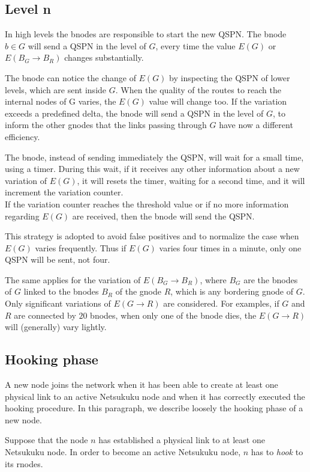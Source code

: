 \documentclass[a4paper]{article}
\begin{document}
\subsection{Level n}
In high levels the bnodes are responsible to start the new QSPN.
The bnode $b \in G$ will send a QSPN in the level of $G$, every time the value
$E(G)$ or\\$E(B_G\rightarrow B_R)$ changes substantially.

The bnode can notice the change of $E(G)$ by inspecting the QSPN of lower
levels, which are sent inside $G$.
When the quality of the routes to reach the internal nodes of G varies, the $E(G)$
value will change too. If the variation exceeds a predefined delta, the bnode
will send a QSPN in the level of $G$, to inform the other gnodes that the links
passing through $G$ have now a different efficiency.

The bnode, instead of sending immediately the QSPN, will wait for a small
time, using a timer. During this wait, if it receives any other information about a
new variation of $E(G)$, it will resets the timer, waiting for a second time,
and it will increment the variation counter.\\
If the variation counter reaches the threshold value or if no more information
regarding $E(G)$ are received, then the bnode will send the QSPN.

This strategy is adopted to avoid false positives and to normalize the case
when $E(G)$ varies frequently. Thus if $E(G)$ varies four times in a minute,
only one QSPN will be sent, not four.

The same applies for the variation of $E(B_G\rightarrow B_R)$, where $B_G$ are
the bnodes of $G$ linked to the bnodes $B_R$ of the gnode $R$, which is any
bordering gnode of $G$. Only significant variations of $E(G\rightarrow R)$ are
considered. For examples, if $G$ and $R$ are connected by $20$ bnodes, when
only one of the bnode dies, the $E(G\rightarrow R)$ will (generally) vary lightly.

\subsection{Hooking phase}
A new node joins the network when it has been able to create at least one
physical link to an active Netsukuku node and when it has correctly executed
the hooking procedure. In this paragraph, we describe loosely the hooking
phase of a new node.

Suppose that the node $n$ has established a physical link to at least one Netsukuku
node. In order to become an active Netsukuku node, $n$ has to \emph{hook} to
its rnodes.
\end{document}
